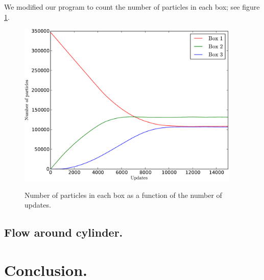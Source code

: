 \documentclass[12pt,a4paper]{article}
\begin{document}
We modified our program to count the number of particles in each box; see figure \ref{gascount}.
\begin{figure}[htp]
\caption{Number of particles in each box as a function of the number of updates.}
\centering
  \includegraphics[width=300pt]{figs/gascount.pdf}
\label{gascount}
\end{figure}

\subsection{Flow around cylinder.}

\section{Conclusion.}
\end{document}

